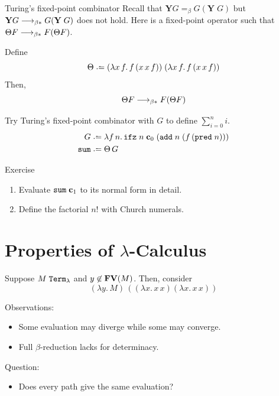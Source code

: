 \begin{frame}{Turing's fixed-point combinator}
  Recall that $\mathbf{Y}G =_\beta G(\mathbf{Y}\;G)$ but $\mathbf{Y}G \longrightarrow_{\beta*}
  G(\mathbf{Y}\;G)$ does not hold.  Here is a fixed-point operator such that
  $\Theta F \longrightarrow_{\beta*} F(\Theta F)$.
\begin{proposition}
  Define 
  \[
    \Theta \defeq 
    (\lambda x\,f.\,f\,(x\,x\,f))\;
    (\lambda x\,f.\,f\,(x\,x\,f))
  \]
  Then, 
  \[
    \Theta F \longrightarrow_{\beta*} F (\Theta F)
  \]
\end{proposition}
Try Turing's fixed-point combinator with $G$ to define $\sum_{i=0}^n i$.
\begin{align*}
  G \defeq{} &
  \lambda f\,n.\,
  \mathtt{ifz}\;n\;\bc_0\;
  (\add\;n\;(f\,(\mathtt{pred}\;n))) \\
  \mathtt{sum} \defeq\; & \Theta\,G 
\end{align*}
\end{frame}

\begin{frame}{Exercise}
  \begin{enumerate}
    \item Evaluate $\mathtt{sum}\;\mathbf{c}_1$ to its normal form in detail.
    \item Define the factorial $n!$ with Church numerals.
  \end{enumerate}
\end{frame}


\section{Properties of $\lambda$-Calculus}

\begin{frame}
  \begin{example}
    Suppose $M \; \mathtt{Term}_\lambda$ and $y \not\in \mathbf{FV}(M)$. 
    Then, consider 
    \[
      (\lambda y.\, M)\, ((\lambda x.\, x\,x)(\lambda x.\, x\, x))
    \]
  \end{example}
  Observations:
  \begin{itemize}
    \item Some evaluation may diverge while some may converge.
    \item Full $\beta$-reduction lacks for determinacy. 
  \end{itemize}
  Question:
  \begin{itemize}
    \item Does every path give the same evaluation?
  \end{itemize}
\end{frame}

